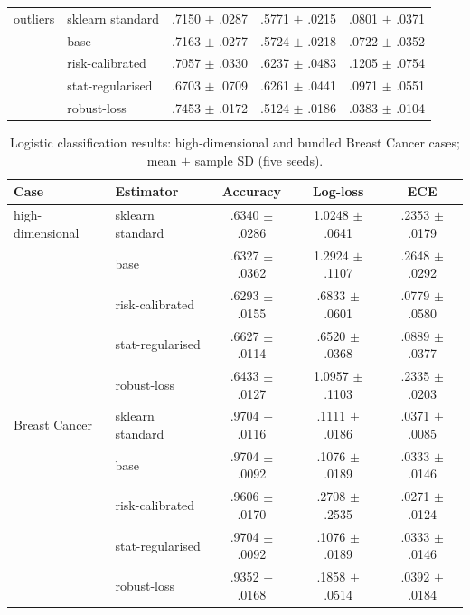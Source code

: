 \documentclass[conference]{IEEEtran}
\begin{document}
\begin{table}[t]
\begin{tabular}{llccc}
\midrule
outliers & sklearn standard & .7150 $\pm$ .0287 & .5771 $\pm$ .0215 & .0801 $\pm$ .0371 \\
 & base & .7163 $\pm$ .0277 & .5724 $\pm$ .0218 & .0722 $\pm$ .0352 \\
 & risk-calibrated & .7057 $\pm$ .0330 & .6237 $\pm$ .0483 & .1205 $\pm$ .0754 \\
 & stat-regularised & .6703 $\pm$ .0709 & .6261 $\pm$ .0441 & .0971 $\pm$ .0551 \\
 & robust-loss & .7453 $\pm$ .0172 & .5124 $\pm$ .0186 & .0383 $\pm$ .0104 \\
\bottomrule
\end{tabular}
\end{table}

\begin{table}[t]
\centering\scriptsize
\setlength{\tabcolsep}{2.6pt}
\caption{Logistic classification results: high-dimensional and bundled Breast Cancer cases; mean $\pm$ sample SD (five seeds).}
\label{tab:logit-b}
\begin{tabular}{llccc}
\toprule
Case & Estimator & Accuracy & Log-loss & ECE \\
\midrule
high-dimensional & sklearn standard & .6340 $\pm$ .0286 & 1.0248 $\pm$ .0641 & .2353 $\pm$ .0179 \\
 & base & .6327 $\pm$ .0362 & 1.2924 $\pm$ .1107 & .2648 $\pm$ .0292 \\
 & risk-calibrated & .6293 $\pm$ .0155 & .6833 $\pm$ .0601 & .0779 $\pm$ .0580 \\
 & stat-regularised & .6627 $\pm$ .0114 & .6520 $\pm$ .0368 & .0889 $\pm$ .0377 \\
 & robust-loss & .6433 $\pm$ .0127 & 1.0957 $\pm$ .1103 & .2335 $\pm$ .0203 \\
\midrule
Breast Cancer & sklearn standard & .9704 $\pm$ .0116 & .1111 $\pm$ .0186 & .0371 $\pm$ .0085 \\
 & base & .9704 $\pm$ .0092 & .1076 $\pm$ .0189 & .0333 $\pm$ .0146 \\
 & risk-calibrated & .9606 $\pm$ .0170 & .2708 $\pm$ .2535 & .0271 $\pm$ .0124 \\
 & stat-regularised & .9704 $\pm$ .0092 & .1076 $\pm$ .0189 & .0333 $\pm$ .0146 \\
 & robust-loss & .9352 $\pm$ .0168 & .1858 $\pm$ .0514 & .0392 $\pm$ .0184 \\
\bottomrule
\end{tabular}
\end{table}
\end{document}
